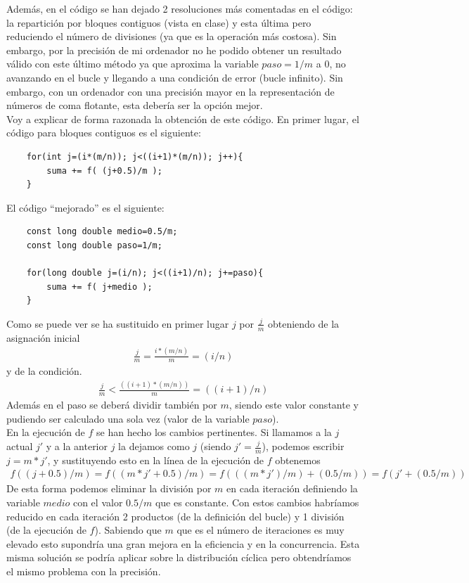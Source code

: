 \documentclass[12pt]{article}
\begin{document}
    Además, en el código se han dejado 2 resoluciones más comentadas en el código: la repartición por bloques contiguos (vista en clase) y esta última pero reduciendo el número de divisiones (ya que es la operación más costosa). Sin embargo, por la precisión de mi ordenador no he podido obtener un resultado válido con este último método ya que aproxima la variable $paso=1/m$ a 0, no avanzando en el bucle y llegando a una condición de error (bucle infinito). Sin embargo, con un ordenador con una precisión mayor en la representación de números de coma flotante, esta debería ser la opción mejor.\\

    Voy a explicar de forma razonada la obtención de este código. En primer lugar, el código para bloques contiguos es el siguiente: 
    \begin{verbatim}
    for(int j=(i*(m/n)); j<((i+1)*(m/n)); j++){ 
        suma += f( (j+0.5)/m );
    }
    \end{verbatim}

    El código ``mejorado'' es el siguiente:

    \begin{verbatim}
    const long double medio=0.5/m;
    const long double paso=1/m;

    for(long double j=(i/n); j<((i+1)/n); j+=paso){ 
        suma += f( j+medio );
    }
    \end{verbatim}

    Como se puede ver se ha sustituido en primer lugar $j$ por $\frac{j}{m}$ obteniendo de la asignación inicial
    \begin{gather*}
        \frac{j}{m}=\frac{i*(m/n)}{m}=(i/n)
    \end{gather*}
    y de la condición.
    \begin{gather*}
        \frac{j}{m}<\frac{((i+1)*(m/n))}{m} = ((i+1)/n)
    \end{gather*}
    Además en el paso se deberá dividir también por $m$, siendo este valor constante y pudiendo ser calculado una sola vez (valor de la variable $paso$).\\

    En la ejecución de $f$ se han hecho los cambios pertinentes. Si llamamos a la $j$ actual $j'$ y a la anterior $j$ la dejamos como $j$ (siendo $j'=\frac{j}{m}$), podemos escribir $j=m*j'$, y sustituyendo esto en la línea de la ejecución de $f$ obtenemos
    \begin{gather*}
        f((j+0.5)/m) = f((m*j'+0.5)/m) = f(((m*j')/m) + (0.5/m)) = f(j'+ (0.5/m))
    \end{gather*}
    De esta forma podemos eliminar la división por $m$ en cada iteración definiendo la variable $medio$ con el valor $0.5/m$ que es constante. Con estos cambios habríamos reducido en cada iteración 2 productos (de la definición del bucle) y 1 división (de la ejecución de $f$). Sabiendo que $m$ que es el número de iteraciones es muy elevado esto supondría una gran mejora en la eficiencia y en la concurrencia. Esta misma solución se podría aplicar sobre la distribución cíclica pero obtendríamos el mismo problema con la precisión.
\end{document}
